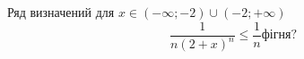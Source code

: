 \documentclass[../rgr_2.tex]{subfiles}
\begin{document}
\Solution
Ряд визначений для $x\in(-\infty; -2)\cup(-2;+\infty)$
\begin{equation}
	\frac{1}{n(2+x)^n}\leq\frac{1}{n} \text{фігня?}
\end{equation}

\Answer{
	<++>
}
\end{document}
